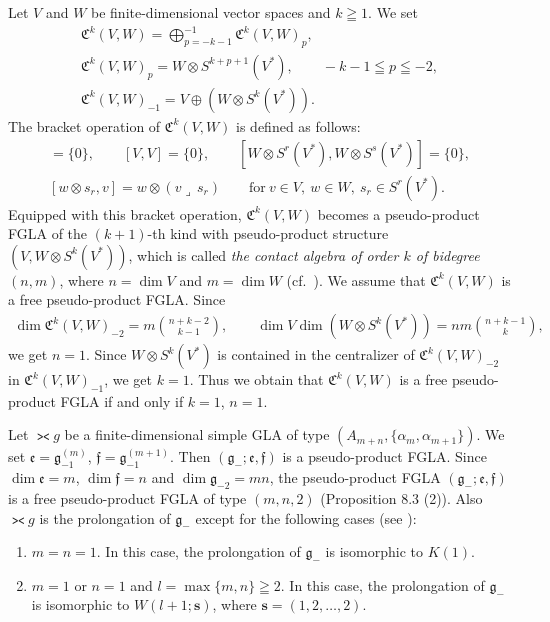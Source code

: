 \begin{example}
Let $V$ and $W$ be f\/inite-dimensional vector spaces and $k\geqq1$.
We set
\begin{gather*}
\mathfrak C^{k}(V,W) =\bigoplus\limits_{p=-k-1}^{-1}\mathfrak C^{k}(V,W)_p, \\
\mathfrak C^{k}(V,W)_p=W\otimes S^{k+p+1}(V^*), \qquad
 -k-1\leqq p\leqq -2, \\
\mathfrak C^{k}(V,W)_{-1} =V\oplus (W\otimes S^{k}(V^*)).
\end{gather*}
The bracket operation of $\mathfrak C^{k}(V,W)$ is def\/ined as follows:
\begin{gather*}
  [W,V]=\{0\},\qquad [V,V]=\{0\}, \qquad [W\otimes S^{r}(V^*),W\otimes S^{s}(V^*)]=\{0\}, \\
[w\otimes s_r,v]=w\otimes (v\lrcorner\,s_r)\qquad \text{for}\  v\in V,\ w\in W,
\ s_r\in S^r(V^*).
\end{gather*}
Equipped with this bracket operation, $\mathfrak C^{k}(V,W)$ becomes
a pseudo-product FGLA of the $(k+1)$-th kind
with pseudo-product structure $(V,W\otimes S^{k}(V^*))$,
which is called
{\it the contact algebra of order $k$ of bidegree} $(n,m)$, where
$n=\dim V$ and $m=\dim W$ (cf.~\cite[p.~133]{yam82:1}).
We assume that $\mathfrak C^{k}(V,W)$ is a free pseudo-product FGLA.
Since
\begin{gather*}
\dim \mathfrak C^{k}(V,W)_{-2}=m\binom{n+k-2}{k-1}, \qquad
\dim V\dim (W\otimes S^{k}(V^*))= nm\binom{n+k-1}{k},
\end{gather*}
we get $n=1$.
Since $W\otimes S^{k}(V^*)$ is contained in the centralizer of
$\mathfrak C^{k}(V,W)_{-2}$
in $\mathfrak C^{k}(V,W)_{-1}$, we get $k=1$.
Thus we obtain that $\mathfrak C^{k}(V,W)$ is a free pseudo-product FGLA
if and only if $k=1$, $n=1$.
\end{example}

\begin{example}\label{ex8.2}
Let $\gla g$ be a f\/inite-dimensional simple GLA of type
$(A_{m+n},\{\alpha_m,\alpha_{m+1}\})$.
We set $\mathfrak e=\mathfrak g_{-1}^{(m)}$, $\mathfrak f=\mathfrak g_{-1}^{(m+1)}$. Then $(\mathfrak g_-;\mathfrak e,\mathfrak f)$
is a pseudo-product FGLA.
Since $\dim \mathfrak e=m$, $\dim\mathfrak f=n$ and
$\dim\mathfrak g_{-2}=mn$, the pseudo-product FGLA
$(\mathfrak g_-;\mathfrak e,\mathfrak f)$ is a free pseudo-product FGLA
of type $(m,n,2)$ (Proposition 8.3 (2)). Also
$\gla g$ is the prolongation of $\mathfrak g_-$ except for the following
cases (see \cite{yam93:1}):
\begin{enumerate}\itemsep=0pt
\item $m=n=1$. In this case,
the prolongation of $\mathfrak g_-$ is isomorphic to $K(1)$.
\item $m=1$ or $n=1$ and $l=\max\{m,n\}\geqq2$. In this case,
the prolongation of $\mathfrak g_-$ is isomorphic to $W(l+1;\bm s)$,
where $\bm s=(1,2,\dots,2)$.
\end{enumerate}
\end{example}

